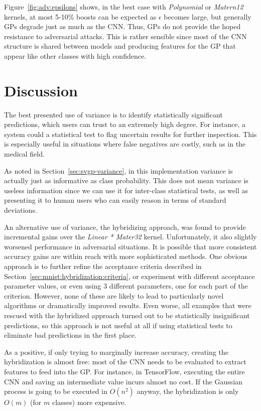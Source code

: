 \documentclass{article}
\begin{document}
Figure~\ref{fig:adv:epsilons} shows, in the best case with \textit{Polynomial} or \textit{Matern12} kernels, at most 5-10\% boosts can be expected as $\epsilon$ becomes large, but generally GPs degrade just as much as the CNN. Thus, GPs do not provide the hoped resistance to adversarial attacks. This is rather sensible since most of the CNN structure is shared between models and producing features for the GP that appear like other classes with high confidence. 

\section{Discussion}
\label{sec:discussion}

The best presented use of variance is to identify statistically significant predictions, which users can trust to an extremely high degree. For instance, a system could a statistical test to flag uncertain results for further inspection. This is especially useful in situations where false negatives are costly, such as in the medical field. 

As noted in Section~\ref{sec:svgp-variance}, in this implementation variance is actually just as informative as class probability. This does not mean variance is useless information since we can use it for inter-class statistical tests, as well as presenting it to human users who can easily reason in terms of standard deviations.

An alternative use of variance, the hybridizing approach, was found to provide incremental gains over the \textit{Linear * Mater32} kernel. Unfortunately, it also slightly worsened performance in adversarial situations. It is possible that more consistent accuracy gains are within reach with more sophisticated methods. One obvious approach is to further refine the acceptance criteria described in Section~\ref{sec:mnist:hybridization:criteria}, or experiment with different acceptance parameter values, or even using 3 different parameters, one for each part of the criterion. However, none of these are likely to lead to particularly novel algorithms or dramatically improved results. Even worse, all examples that were rescued with the hybridized approach turned out to be statistically insignificant predictions, so this approach is not useful at all if using statistical tests to eliminate bad predictions in the first place.

As a positive, if only trying to marginally increase accuracy, creating the hybridization is almost free: most of the CNN needs to be evaluated to extract features to feed into the GP. For instance, in TensorFlow, executing the entire CNN and saving an intermediate value incurs almost no cost. If the Gaussian process is going to be executed in $O(n^2)$ anyway, the hybridization is only $O(m)$ (for $m$ classes) more expensive.
\end{document}
